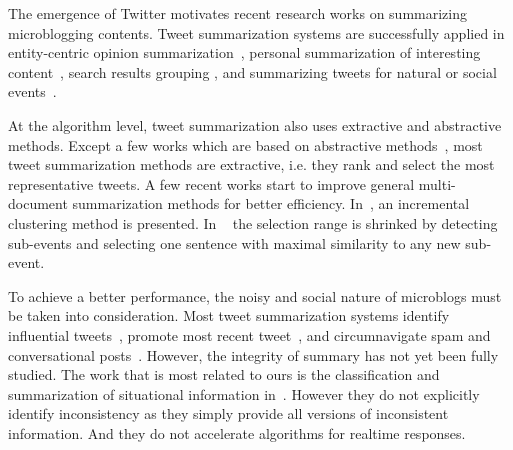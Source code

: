 \documentclass[envcountsame]{llncs}
\begin{document}


The emergence of Twitter motivates recent research works on summarizing microblogging contents. Tweet summarization systems are successfully applied in entity-centric opinion summarization~\cite{Meng2012Entitycentric}, personal summarization of interesting content~\cite{Ren2013Personalized,Chin2017TOTEM}, search results grouping \cite{Mathioudakis2010TwitterMonitor}, and summarizing tweets for natural or social events~\cite{Takamura2011Summarizing,Lin2012Generating,Rudra2015Extracting,Shou2013Sumblr,Liu2016LEDS,Gillani2017Post,Zubiaga2012Towards}.

At the algorithm level, tweet summarization also uses extractive and abstractive methods. Except a few works which are based on abstractive methods~\cite{Sharifi2010Summarizing}, most tweet summarization methods are extractive, i.e. they rank and select the most representative tweets. A few recent works start to improve general multi-document summarization methods for better efficiency. In~\cite{Shou2013Sumblr}, an incremental clustering method is presented. In ~\cite{Zubiaga2012Towards} the selection range is shrinked by detecting sub-events and selecting one sentence with maximal similarity to any new sub-event.

To achieve a better performance, the noisy and social nature of microblogs must be taken into consideration. Most tweet summarization systems identify influential tweets~\cite{Hannon2010Recommending},  promote most recent tweet~\cite{Efron2011Estimation}, and circumnavigate spam and conversational posts~\cite{Gillani2017Post}. However, the integrity of summary has not yet been fully studied. The work that is most related to ours is the
classification and summarization of situational information in~\cite{Rudra2015Extracting,Rudra2016Summarizing}. However they do not explicitly identify inconsistency as they simply provide all versions of inconsistent information. And they do not accelerate algorithms for realtime responses.
\end{document}

